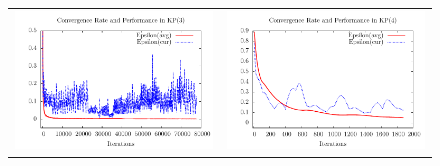 \documentclass{aamas2014}
\begin{document}
\begin{figure}[t]
\begin{center}
\begin{tabular}{cc}
\includegraphics[scale=0.7]{figs/sfrd3-conv}    & \includegraphics[scale=0.7]{figs/sfrd4-conv} \\

\end{tabular}
\end{center}
\end{figure}
\end{document}
